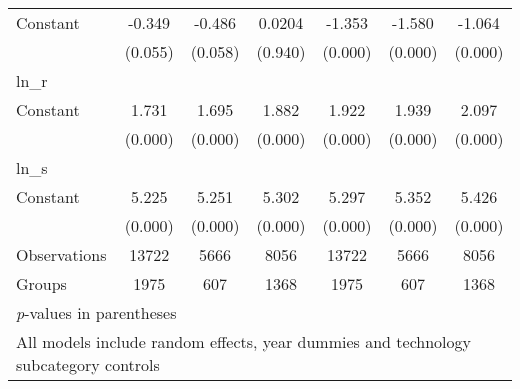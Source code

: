 \begin{sidewaystable}[htbp]
\begin{tabular}{l*{6}{c}}
Constant        &   -0.349&   -0.486&   0.0204&   -1.353&   -1.580&   -1.064\\
                &  (0.055)&  (0.058)&  (0.940)&  (0.000)&  (0.000)&  (0.000)\\
\hline
ln\_r            &         &         &         &         &         &         \\
Constant        &    1.731&    1.695&    1.882&    1.922&    1.939&    2.097\\
                &  (0.000)&  (0.000)&  (0.000)&  (0.000)&  (0.000)&  (0.000)\\
\hline
ln\_s            &         &         &         &         &         &         \\
Constant        &    5.225&    5.251&    5.302&    5.297&    5.352&    5.426\\
                &  (0.000)&  (0.000)&  (0.000)&  (0.000)&  (0.000)&  (0.000)\\
\hline
Observations    &    13722&     5666&     8056&    13722&     5666&     8056\\
Groups          &     1975&      607&     1368&     1975&      607&     1368\\
\hline\hline
\multicolumn{7}{l}{\footnotesize \textit{p}-values in parentheses}\\
\multicolumn{7}{l}{\footnotesize All models include random effects, year dummies and technology subcategory controls}\\
\end{tabular}
\end{sidewaystable}
